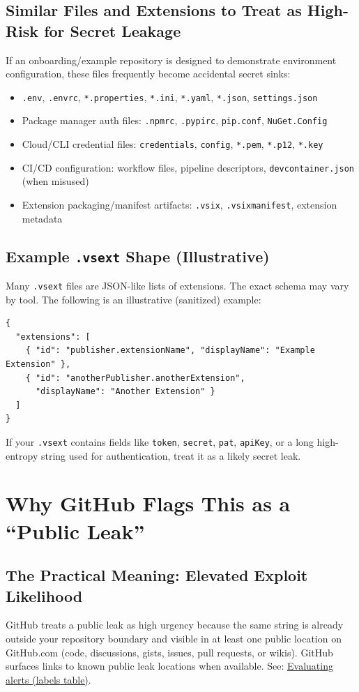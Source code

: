 \documentclass[11pt]{article}
\newcommand{\codeinline}[1]{\texttt{#1}}
\begin{document}
\subsection{Similar Files and Extensions to Treat as High-Risk for Secret Leakage}
If an onboarding/example repository is designed to demonstrate environment configuration, these files frequently become accidental secret sinks:
\begin{itemize}
  \item \codeinline{.env}, \codeinline{.envrc}, \codeinline{*.properties}, \codeinline{*.ini}, \codeinline{*.yaml}, \codeinline{*.json}, \codeinline{settings.json}
  \item Package manager auth files: \codeinline{.npmrc}, \codeinline{.pypirc}, \codeinline{pip.conf}, \codeinline{NuGet.Config}
  \item Cloud/CLI credential files: \codeinline{credentials}, \codeinline{config}, \codeinline{*.pem}, \codeinline{*.p12}, \codeinline{*.key}
  \item CI/CD configuration: workflow files, pipeline descriptors, \codeinline{devcontainer.json} (when misused)
  \item Extension packaging/manifest artifacts: \codeinline{.vsix}, \codeinline{.vsixmanifest}, extension metadata
\end{itemize}

\subsection{Example \codeinline{.vsext} Shape (Illustrative)}
Many \codeinline{.vsext} files are JSON-like lists of extensions. The exact schema may vary by tool. The following is an illustrative (sanitized) example:
\begin{verbatim}
{
  "extensions": [
    { "id": "publisher.extensionName", "displayName": "Example Extension" },
    { "id": "anotherPublisher.anotherExtension",
      "displayName": "Another Extension" }
  ]
}
\end{verbatim}
If your \codeinline{.vsext} contains fields like \codeinline{token}, \codeinline{secret}, \codeinline{pat}, \codeinline{apiKey}, or a long high-entropy string used for authentication, treat it as a likely secret leak.

\section{Why GitHub Flags This as a ``Public Leak''}
\subsection{The Practical Meaning: Elevated Exploit Likelihood}
GitHub treats a public leak as high urgency because the same string is already outside your repository boundary and visible in at least one public location on GitHub.com (code, discussions, gists, issues, pull requests, or wikis). GitHub surfaces links to known public leak locations when available. See: \href{https://docs.github.com/en/enterprise-cloud@latest/code-security/tutorials/remediate-leaked-secrets/evaluating-alerts}{Evaluating alerts (labels table)}.
\end{document}
